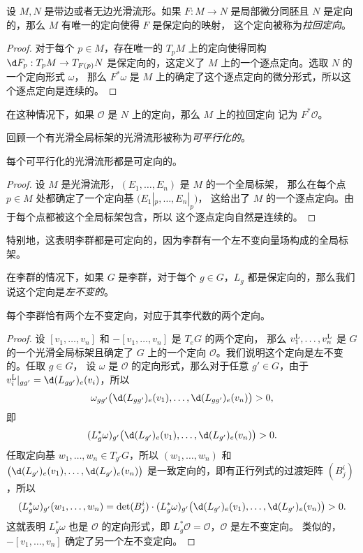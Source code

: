 \begin{proposition}[拉回定向]
  设 $M,N$ 是带边或者无边光滑流形。如果 $F:M\to N$ 是局部微分同胚且
  $N$ 是定向的，那么 $M$ 有唯一的定向使得 $F$ 是保定向的映射，
  这个定向被称为\emph{拉回定向}。
\end{proposition}
\begin{proof}
  对于每个 $p\in M$，存在唯一的 $T_pM$ 上的定向使得同构 $\d F_p:T_pM\to T_{F(p)}N$
  是保定向的，这定义了 $M$ 上的一个逐点定向。选取 $N$ 的一个定向形式 $\omega$，
  那么 $F^*\omega$ 是 $M$ 上的确定了这个逐点定向的微分形式，所以这个逐点定向是连续的。
\end{proof}

在这种情况下，如果 $\mathcal{O}$ 是 $N$ 上的定向，那么 $M$ 上的拉回定向
记为 $F^*\mathcal{O}$。

回顾一个有光滑全局标架的光滑流形被称为\emph{可平行化的}。

\begin{proposition}
  每个可平行化的光滑流形都是可定向的。
\end{proposition}
\begin{proof}
  设 $M$ 是光滑流形，$(E_1,\dots,E_n)$ 是 $M$ 的一个全局标架，
  那么在每个点 $p\in M$ 处都确定了一个定向基 $\bigl(E_1|_p,\dots,E_n|_p\bigr)$，
  这给出了 $M$ 的一个逐点定向。由于每个点都被这个全局标架包含，所以
  这个逐点定向自然是连续的。
\end{proof}

特别地，这表明李群都是可定向的，因为李群有一个左不变向量场构成的全局标架。

在李群的情况下，如果 $G$ 是李群，对于每个 $g\in G$，$L_g$
都是保定向的，那么我们说这个定向是\emph{左不变的}。

\begin{proposition}
  每个李群恰有两个左不变定向，对应于其李代数的两个定向。
\end{proposition}
\begin{proof}
  设 $[v_1,\dots,v_n]$ 和 $-[v_1,\dots,v_n]$ 是 $T_eG$ 的两个定向，
  那么 $v_1^{\mathrm{L}},\dots,v_n^{\mathrm{L}}$ 是 $G$ 的一个光滑全局标架且确定了
  $G$ 上的一个定向 $\mathcal{O}$。我们说明这个定向是左不变的。任取 $g\in G$，
  设 $\omega$ 是 $\mathcal{O}$ 的定向形式，那么对于任意
  $g'\in G$，由于 $v_i^\LL|_{gg'}=\d (L_{gg'})_e(v_i)$，所以
  \[
    \omega_{gg'}\bigl(\d (L_{gg'})_e(v_1),\dots,\d (L_{gg'})_e(v_n)\bigr)>0,
  \]
  即
  \[
    (L_g^*\omega)_{g'}\bigl(\d (L_{g'})_e(v_1),\dots,\d (L_{g'})_e(v_n)\bigr)>0.
  \]
  任取定向基 $w_1,\dots,w_n\in T_{g'}G$，所以 $(w_1,\dots,w_n)$ 和 $\bigl(\d (L_{g'})_e(v_1),\dots,\d (L_{g'})_e(v_n)\bigr)$
  是一致定向的，即有正行列式的过渡矩阵 $(B^i_j)$，所以
  \[
    (L_g^*\omega)_{g'}(w_1,\dots,w_n)=\det(B^i_j)\cdot (L_g^*\omega)_{g'}\bigl(\d (L_{g'})_e(v_1),\dots,\d (L_{g'})_e(v_n)\bigr)>0.
  \]
  这就表明 $L_g^*\omega$ 也是 $\mathcal{O}$ 的定向形式，即
  $L_g^* \mathcal{O}=\mathcal{O}$，$\mathcal{O}$ 是左不变定向。
  类似的，$-[v_1,\dots,v_n]$ 确定了另一个左不变定向。
\end{proof}

